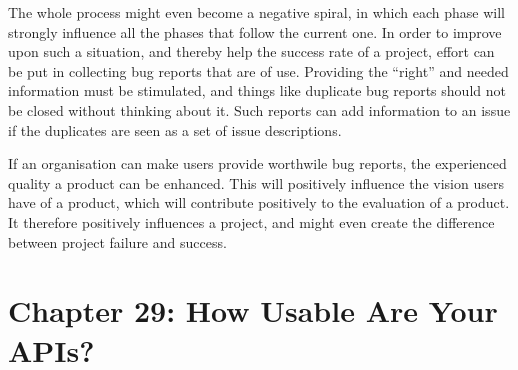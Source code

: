 \documentclass[]{uva-bachelor-thesis}
\def \CurrChapter {}
\def \CurrSection {}
\renewcommand{\chaptermark}[1]{\def \CurrChapter {#1} \def \CurrSection {}}
\begin{document}
The whole process might even become a negative spiral, in which each phase will strongly influence all the phases that follow the current one.
In order to improve upon such a situation, and thereby help the success rate of a project, effort can be put in collecting bug reports that are of use. 
Providing the ``right'' and needed information must be stimulated, and things like duplicate bug reports should not be closed without thinking about it. 
Such reports can add information to an issue if the duplicates are seen as a set of issue descriptions. 

If an organisation can make users provide worthwile bug reports, the experienced quality a product can be enhanced.
This will positively influence the vision users have of a product, which will contribute positively to the evaluation of a product. 
It therefore positively influences a project, and might even create the difference between project failure and success.

\chapter{Chapter 29: How Usable Are Your APIs? \cite{makingsoftware}}



\chaptermark{Bibliography}
\end{document}
